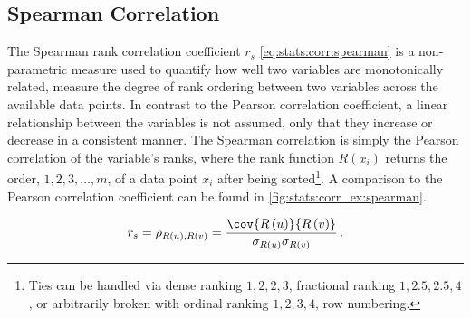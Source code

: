 \subsection{Spearman Correlation}
\label{stats:corr_covar:spearman}

The Spearman rank correlation coefficient $r_{s}$ \cref{eq:stats:corr:spearman} is a non-parametric measure
used to quantify how well two variables are monotonically related,
\ie measure the degree of rank ordering between two variables across the available data points.
In contrast to the Pearson correlation coefficient,
a linear relationship between the variables is not assumed,
only that they increase or decrease in a consistent manner.
The Spearman correlation is simply the Pearson correlation of the variable's ranks,
where the rank function $R\left(x_{i}\right)$ returns the order,
$1, 2, 3, \ldots, m$, of a data point $x_{i}$ after being sorted\footnote{Ties
can be handled via dense ranking $1,2,2,3$, fractional ranking $1,2.5,2.5,4$, or arbitrarily broken with ordinal ranking $1,2,3,4$, \ie row numbering.}.
A comparison to the Pearson correlation coefficient can be found in \cref{fig:stats:corr_ex:spearman}.

\begin{equation}\label{eq:stats:corr:spearman}
r_{s} = \rho_{R\left(u\right),R\left(v\right)} = \frac{\cov{R\left(u\right)}{R\left(v\right)}}{\sigma_{R\left(u\right)}\sigma_{R\left(v\right)}}\,.
\end{equation}

